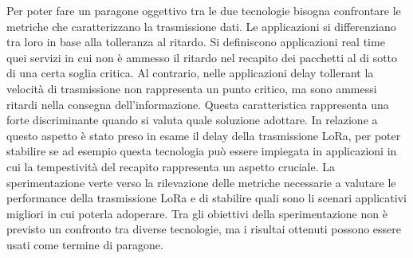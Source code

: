 \documentclass[12pt,a4paper,openright,twoside]{report}
\begin{document}
Per poter fare un paragone oggettivo tra le due tecnologie bisogna confrontare le metriche che caratterizzano la trasmissione dati. Le applicazioni si differenziano tra loro in base alla tolleranza al ritardo. Si definiscono applicazioni real time quei servizi in cui non \`e ammesso il ritardo nel recapito dei pacchetti al di sotto di una certa soglia critica. Al contrario, nelle applicazioni delay tollerant la velocit\`a di trasmissione non rappresenta un punto critico, ma sono ammessi ritardi nella consegna dell'informazione. Questa caratteristica rappresenta una forte discriminante quando si valuta quale soluzione adottare. In relazione a questo aspetto \`e stato preso in esame il delay della trasmissione LoRa, per poter stabilire se ad esempio questa tecnologia pu\`o essere impiegata in applicazioni in cui la tempestivit\`a del recapito rappresenta un aspetto cruciale.  
La sperimentazione verte verso la rilevazione delle metriche necessarie a valutare le performance della trasmissione LoRa e di stabilire quali sono li scenari applicativi migliori in cui poterla adoperare.  
Tra gli obiettivi della sperimentazione non \`e previsto un confronto tra diverse tecnologie, ma i risultai ottenuti possono essere usati come termine di paragone.
\end{document}
